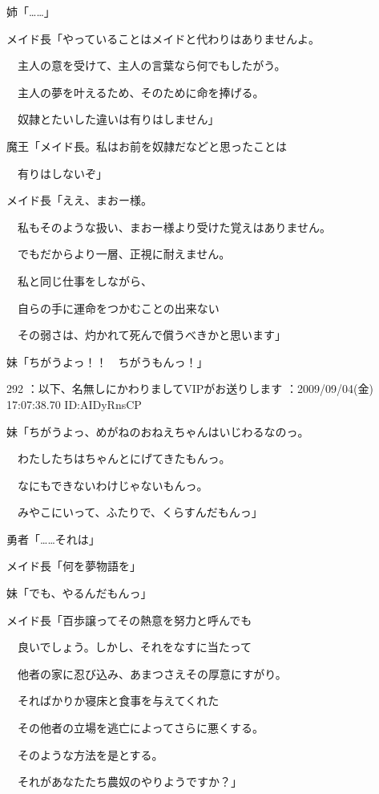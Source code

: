 \documentclass[a4j,twocolumn]{tarticle}
\begin{document}
姉「……」 



メイド長「やっていることはメイドと代わりはありませんよ。\par{} 
　主人の意を受けて、主人の言葉なら何でもしたがう。\par{} 
　主人の夢を叶えるため、そのために命を捧げる。\par{} 
　奴隷とたいした違いは有りはしません」 



魔王「メイド長。私はお前を奴隷だなどと思ったことは\par{} 
　有りはしないぞ」 



メイド長「ええ、まおー様。\par{} 
　私もそのような扱い、まおー様より受けた覚えはありません。\par{} 
　でもだからより一層、正視に耐えません。\par{} 
　私と同じ仕事をしながら、\par{} 
　自らの手に運命をつかむことの出来ない\par{} 
　その弱さは、灼かれて死んで償うべきかと思います」 



妹「ちがうよっ！！　ちがうもんっ！」 

	
    
    

292 ：以下、名無しにかわりましてVIPがお送りします ：2009/09/04(金) 17:07:38.70 ID:AIDyRnsCP 


妹「ちがうよっ、めがねのおねえちゃんはいじわるなのっ。\par{} 
　わたしたちはちゃんとにげてきたもんっ。\par{} 
　なにもできないわけじゃないもんっ。\par{} 
　みやこにいって、ふたりで、くらすんだもんっ」 



勇者「……それは」 



メイド長「何を夢物語を」 



妹「でも、やるんだもんっ」 



メイド長「百歩譲ってその熱意を努力と呼んでも\par{} 
　良いでしょう。しかし、それをなすに当たって\par{} 
　他者の家に忍び込み、あまつさえその厚意にすがり。\par{} 
　そればかりか寝床と食事を与えてくれた\par{} 
　その他者の立場を逃亡によってさらに悪くする。\par{} 
　そのような方法を是とする。\par{} 
　それがあなたたち農奴のやりようですか？」 
\end{document}

